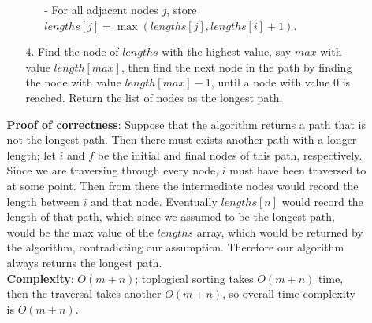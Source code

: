 \documentclass{article}
\begin{document}
\begin{itemize}
\begin{itemize}
\begin{itemize}
                        \begin{itemize}
                            \item [-] For all adjacent nodes $j$, store $lengths[j]=\max(lengths[j],lengths[i]+1)$.
                        \end{itemize}
                        \item [4.] Find the node of $lengths$ with the highest value, say $max$ with value $length[max]$, then find the next node in the path by finding the node with value $length[max]-1$, until a node with value 0 is reached. Return the list of nodes as the longest path.
                    \end{itemize}
                    \textbf{Proof of correctness}: Suppose that the algorithm returns a path that is not the longest path. Then there must exists another path with a longer length; let $i$ and $f$ be the initial and final nodes of this path, respectively. Since we are traversing through every node, $i$ must have been traversed to at some point. Then from there the intermediate nodes would record the length between $i$ and that node. Eventually $lengths[n]$ would record the length of that path, which since we assumed to be the longest path, would be the max value of the $lengths$ array, which would be returned by the algorithm, contradicting our assumption. Therefore our algorithm always returns the longest path.\\
                    \textbf{Complexity}: $O(m+n)$; toplogical sorting takes $O(m+n)$ time, then the traversal takes another $O(m+n)$, so overall time complexity is $O(m+n)$.
          \end{itemize}
\end{itemize}
\end{document}
